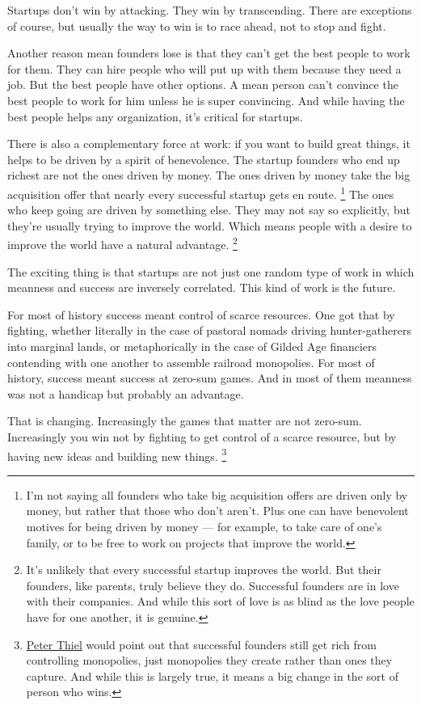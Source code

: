 Startups don't win by attacking. They win by transcending. There are
exceptions of course, but usually the way to win is to race ahead, not
to stop and fight.

Another reason mean founders lose is that they can't get the best people
to work for them. They can hire people who will put up with them because
they need a job. But the best people have other options. A mean person
can't convince the best people to work for him unless he is super
convincing. And while having the best people helps any organization,
it's critical for startups.

There is also a complementary force at work: if you want to build great
things, it helps to be driven by a spirit of benevolence. The startup
founders who end up richest are not the ones driven by money. The ones
driven by money take the big acquisition offer that nearly every
successful startup gets en route. \footnote{I'm not saying all founders who take big acquisition offers are
driven only by money, but rather that those who don't aren't. Plus one
can have benevolent motives for being driven by money --- for example,
to take care of one's family, or to be free to work on projects that
improve the world.} The ones who
keep going are driven by something else. They may not say so explicitly,
but they're usually trying to improve the world. Which means people with
a desire to improve the world have a natural advantage.
\footnote{It's unlikely that every successful startup improves the world.
But their founders, like parents, truly believe they do. Successful
founders are in love with their companies. And while this sort of love
is as blind as the love people have for one another, it is genuine.}

The exciting thing is that startups are not just one random type of work
in which meanness and success are inversely correlated. This kind of
work is the future.

For most of history success meant control of scarce resources. One got
that by fighting, whether literally in the case of pastoral nomads
driving hunter-gatherers into marginal lands, or metaphorically in the
case of Gilded Age financiers contending with one another to assemble
railroad monopolies. For most of history, success meant success at
zero-sum games. And in most of them meanness was not a handicap but
probably an advantage.

That is changing. Increasingly the games that matter are not zero-sum.
Increasingly you win not by fighting to get control of a scarce
resource, but by having new ideas and building new things.
\footnote{\href{http://startupclass.samaltman.com/courses/lec05}{Peter
Thiel} would point out that successful founders still get rich from
controlling monopolies, just monopolies they create rather than ones
they capture. And while this is largely true, it means a big change in
the sort of person who wins.}

